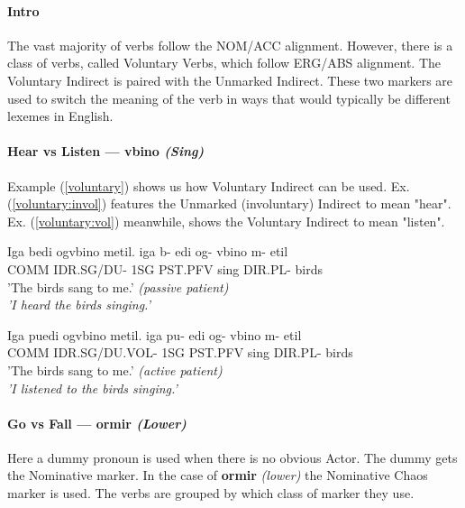 \documentclass[11pt]{article}
\newcommand{\exref}[1]{(\ref{#1})}
\begin{document}
\paragraph{Intro}
The vast majority of verbs follow the NOM/ACC alignment.
However, there is a class of verbs, called Voluntary Verbs, which follow ERG/ABS alignment.
The Voluntary Indirect is paired with the Unmarked Indirect.
These two markers are used to switch the meaning of the verb
in ways that would typically be different lexemes in English.

\paragraph{Hear vs Listen — vbino \textit{(Sing)}}
Example \exref{voluntary} shows us how Voluntary Indirect can be used.
Ex. \exref{voluntary:invol} features the Unmarked (involuntary) Indirect to mean "hear".
Ex. \exref{voluntary:vol} meanwhile, shows the Voluntary Indirect to mean "listen".

\begin{exe}
\ex \label{voluntary}
\begin{xlist}
\ex \label{voluntary:invol}
Iga bedi ogvbino metil.
\gll
iga  b-         edi og-     vbino     m-       etil \\
COMM IDR.SG/DU- 1SG PST.PFV sing DIR.PL- birds \\
\trans 
    {\textthin{}'The birds sang to me.' \textit{(passive patient)}}\\
    \textit{'I heard the birds singing.'}

\ex \label{voluntary:vol}
Iga puedi ogvbino metil.
\gll
iga  pu-            edi og-     vbino     m-       etil \\
COMM IDR.SG/DU.VOL- 1SG PST.PFV sing DIR.PL- birds \\
\trans 
    {\textthin{}'The birds sang to me.' \textit{(active patient)}}\\
    \textit{'I listened to the birds singing.'}
\end{xlist}
\end{exe}

\paragraph{Go vs Fall — ormir \textit{(Lower)}}
Here a dummy pronoun is used when there is no obvious Actor.
The dummy gets the Nominative marker.
In the case of \textbf{ormir} \textit{(lower)} the Nominative Chaos marker is used.
The verbs are grouped by which class of marker they use.
\end{document}
